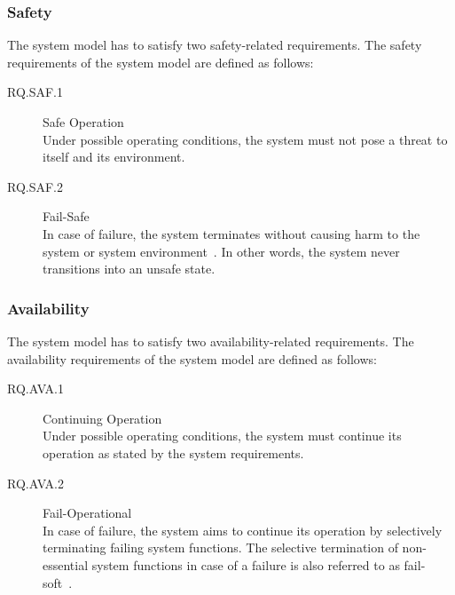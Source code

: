 \subsubsection{Safety}
The system model has to satisfy two safety-related requirements.
The safety requirements of the system model are defined as follows:
\begin{description}
    \item[RQ.SAF.1] Safe Operation\\
    Under possible operating conditions, the system must not pose a threat to itself and its environment.
    \item[RQ.SAF.2] Fail-Safe\\
    In case of failure, the system terminates without causing harm to the system or system environment~\cite{rfc4949}.
    In other words, the system never transitions into an unsafe state.
\end{description}

\subsubsection{Availability}
The system model has to satisfy two availability-related requirements.
The availability requirements of the system model are defined as follows:
\begin{description}
    \item[RQ.AVA.1] Continuing Operation\\
    Under possible operating conditions, the system must continue its operation as stated by the system requirements.
    \item[RQ.AVA.2] Fail-Operational\\
    In case of failure, the system aims to continue its operation by selectively terminating failing system functions.
    The selective termination of non-essential system functions in case of a failure is also referred to as fail-soft~\cite{rfc4949}.
\end{description}

